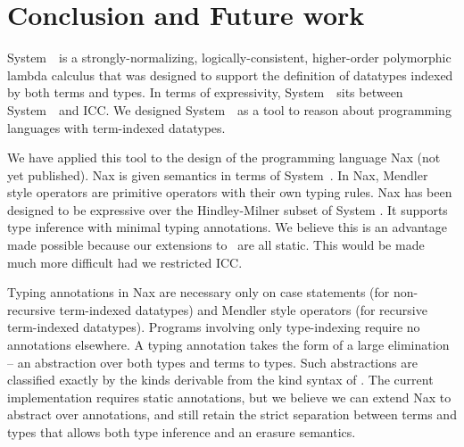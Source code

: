 \section{Conclusion and Future work}
\label{sec:concl}

System~\Fi\ is a strongly-normalizing, logically-consistent, higher-order
polymorphic lambda calculus that was designed to support the
definition of datatypes indexed by both terms and types.
In terms of expressivity, System~\Fi\ sits between System~\Fw\ and ICC.
We designed System~\Fi\ as a tool to reason about programming
languages with term-indexed datatypes. 

We have applied this tool to the design of the programming language Nax (not yet published).
Nax is given semantics in terms of System~\Fi . In Nax, Mendler style operators
are primitive operators with their own typing rules. Nax has been designed to
be expressive over the Hindley-Milner subset of System \Fi. It supports type
inference with minimal typing annotations. We believe this is an advantage
made possible because our extensions to \Fw\ are all static. This would be made
much more difficult had we restricted ICC.

Typing annotations in Nax are necessary only
on case statements (for non-recursive term-indexed datatypes)
and Mendler style operators (for recursive term-indexed datatypes).
Programs involving only type-indexing require no annotations elsewhere.
A typing annotation takes the form of a large elimination --
an abstraction over both types and terms to types. Such abstractions
are classified exactly by the kinds derivable from the kind
syntax of \Fi.   The current implementation requires
static annotations, but we believe we can extend Nax to abstract over
annotations, and still retain the strict separation between terms and types
that allows both type inference and an erasure semantics.
 
